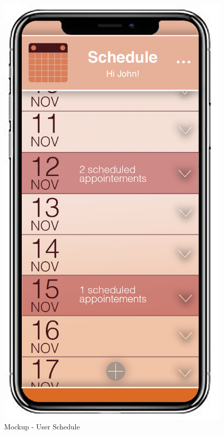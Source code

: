 \begin{figure}[H]	
	\centerline{\includegraphics[width=0.3\paperwidth]{Images/UserSchedule}}
	\caption{Mockup - User Schedule}
\end{figure}
